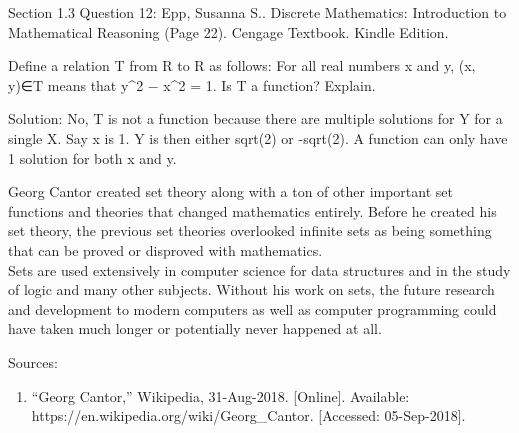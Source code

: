 \documentclass{article}
\begin{document}
\clearpage
\header
Section 1.3 Question 12: Epp, Susanna S.. Discrete Mathematics: Introduction to Mathematical Reasoning (Page 22). Cengage Textbook. Kindle Edition. 
\begin{algorithm}
Define a relation T from R to R as follows: For all real numbers x and y, (x, y)∈T means that y^2 − x^2 = 1. Is T a function? Explain.
\end{algorithm}


Solution: No, T is not a function because there are multiple solutions for Y for a single X. Say x is 1. Y is then either sqrt(2) or -sqrt(2). A function can only have 1 solution for both x and y.  

\clearpage
\header
Georg Cantor created set theory along with a ton of other important set functions and theories that changed mathematics entirely. Before he created his set theory, the previous set theories overlooked infinite sets as being something that can be proved or disproved with mathematics. \\
\newline
Sets are used extensively in computer science for data structures and in the study of logic and many other subjects. Without his work on sets, the future research and development to modern computers as well as computer programming could have taken much longer or potentially never happened at all. \newline

Sources:
\begin{enumerate}
\item “Georg Cantor,” Wikipedia, 31-Aug-2018. [Online]. Available: https://en.wikipedia.org/wiki/Georg_Cantor. [Accessed: 05-Sep-2018].
\end{enumerate}


 
\end{document}
